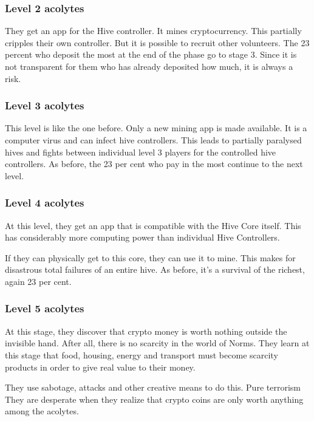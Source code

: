 \subsubsection{Level 2 acolytes}

They get an app for the Hive controller. It mines cryptocurrency. This partially cripples their own controller. But it is possible to recruit other volunteers.
The 23 percent who deposit the most at the end of the phase go to stage 3. Since it is not transparent for them who has already deposited how much, it is always a risk.

\subsubsection{Level 3 acolytes}

This level is like the one before. Only a new mining app is made available. It is a computer virus and can infect hive controllers. This leads to partially paralysed hives and fights between individual level 3 players for the controlled hive controllers.
As before, the 23 per cent who pay in the most continue to the next level.

\subsubsection{Level 4 acolytes}

At this level, they get an app that is compatible with the Hive Core itself. This has considerably more computing power than individual Hive Controllers.

If they can physically get to this core, they can use it to mine. This makes for disastrous total failures of an entire hive.
As before, it's a survival of the richest, again 23 per cent.

\subsubsection{Level 5 acolytes}

At this stage, they discover that crypto money is worth nothing outside the invisible hand. After all, there is no scarcity in the world of Norms. They learn at this stage that food, housing, energy and transport must become scarcity products in order to give real value to their money.

They use sabotage, attacks and other creative means to do this. Pure terrorism
They are desperate when they realize that crypto coins are only worth anything among the acolytes.


